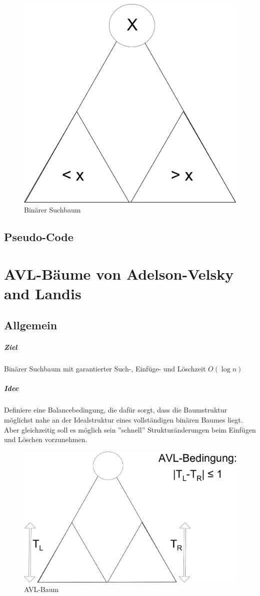 \pagebreak
\begin{figure}[H]
\includegraphics[width=0.2\linewidth]{10/Grafik/img1.png}
\captionsetup{justification=raggedright, singlelinecheck=false}
\caption{Binärer Suchbaum}
\end{figure}

\section{Pseudo-Code}



\chapter{AVL-Bäume von Adelson-Velsky and Landis}%
\section{Allgemein} %
\paragraph{Ziel}Binärer Suchbaum mit garantierter Such-, Einfüge- und Löschzeit $O(\log n )$
\paragraph{Idee} Definiere eine Balancebedingung, die dafür sorgt, dass die Baumstruktur möglichst nahe an der Idealstruktur eines vollständigen binären Baumes liegt.\\
Aber gleichzeitig soll es möglich sein ''schnell'' Strukturänderungen beim Einfügen und Löschen vorzunehmen. \\

\begin{figure}[H]
\includegraphics[width=0.4\linewidth]{10/Grafik/img2.png}
\captionsetup{justification=raggedright, singlelinecheck=false}
\caption{AVL-Baum}
\end{figure}


